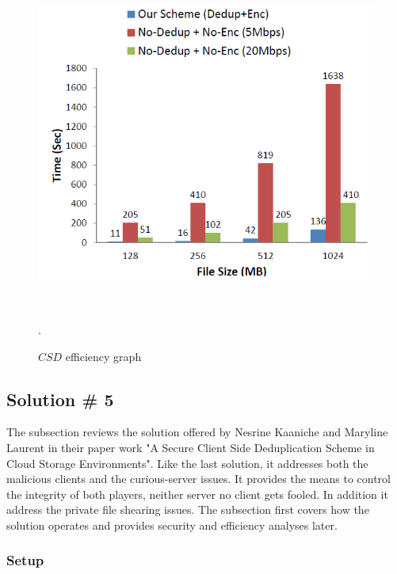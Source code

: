 \documentclass[12pt]{article}
\begin{document}
\begin{figure}[ht] 
\begin{center}
\includegraphics[height=310pt,width=400pt]{CSD}
\caption{$CSD$ efficiency graph \cite{Leakage-Resilient}}
\label{fig:CSD} .
\end{center}
\end{figure}

\pagebreak

\subsection{Solution \# 5}
\label{sub:Soltuion5}

The subsection reviews the solution offered by Nesrine Kaaniche and Maryline Laurent in their paper work "A Secure Client Side Deduplication Scheme in Cloud Storage Environments".\cite{Kaaniche} Like the last solution, it addresses both the malicious clients and the curious-server issues. It provides the means to control the integrity of both players, neither server no client gets fooled. In addition it address the private file shearing issues. The subsection first covers how the solution operates and provides security and efficiency analyses later.

\subsubsection{Setup}
\label{subsub:setup5}
\end{document}
